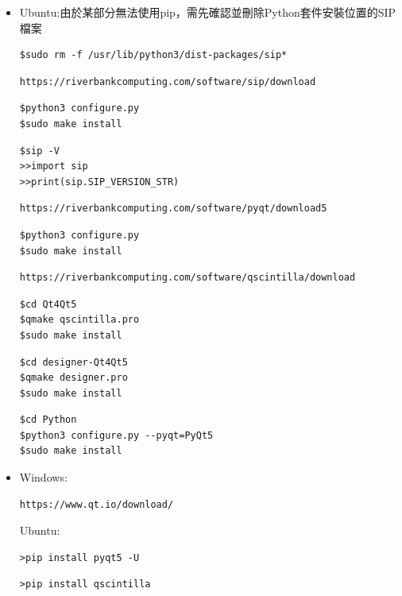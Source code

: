 \documentclass[14pt,a4paper]{report}  %
\begin{document}
{     \begin{itemize}
		\item Ubuntu:由於某部分無法使用pip，需先確認並刪除Python套件安裝位置的SIP檔案
		\begin{lstlisting}[caption=刪除SIP檔案]
$sudo rm -f /usr/lib/python3/dist-packages/sip*
		\end{lstlisting}
		\begin{lstlisting}[caption=下載新版SIP]
https://riverbankcomputing.com/software/sip/download
		\end{lstlisting}
		\begin{lstlisting}[caption=解壓縮後安裝]
$python3 configure.py
$sudo make install
		\end{lstlisting}
		\begin{lstlisting}[caption=核對Python內的版本]
$sip -V
>>import sip
>>print(sip.SIP_VERSION_STR)
		\end{lstlisting}
		\begin{lstlisting}[caption=下載新版PyQt5]
https://riverbankcomputing.com/software/pyqt/download5
		\end{lstlisting}
		\begin{lstlisting}[caption=解壓縮後安裝]
$python3 configure.py
$sudo make install
		\end{lstlisting}
		\begin{lstlisting}[caption=下載新版的QScintilla 2]
https://riverbankcomputing.com/software/qscintilla/download
		\end{lstlisting}
		
		\begin{lstlisting}[caption=本體]
$cd Qt4Qt5
$qmake qscintilla.pro
$sudo make install
		\end{lstlisting}
		\begin{lstlisting}[caption=Designer]
$cd designer-Qt4Qt5
$qmake designer.pro
$sudo make install
		\end{lstlisting}
		\begin{lstlisting}[caption=Python bundings]
$cd Python
$python3 configure.py --pyqt=PyQt5
$sudo make install
		\end{lstlisting}
		\end{itemize}  
		     
     \begin{itemize}
		\item Windows:
		\begin{lstlisting}[caption=下載Qt檔]
https://www.qt.io/download/
		\end{lstlisting}
		Ubuntu:\\
		\begin{lstlisting}[caption=使用pip安裝PyQt5]
>pip install pyqt5 -U
		\end{lstlisting}
		\begin{lstlisting}[caption=使用pip安裝QScintilla 2]
>pip install qscintilla
		\end{lstlisting}
		\end{itemize} 
		      
}
\end{document}
